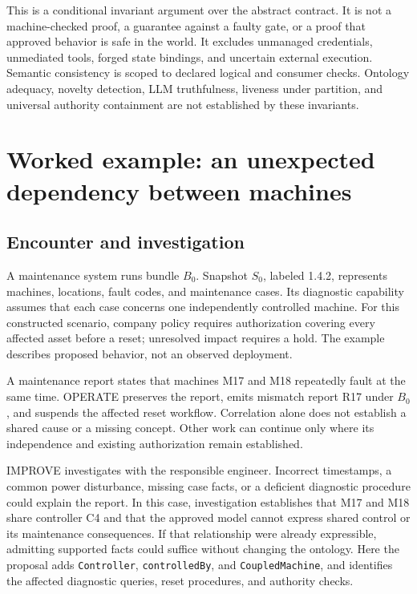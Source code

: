 \documentclass[preprint,12pt,authoryear]{elsarticle}
\begin{document}
This is a conditional invariant argument over the abstract contract. It
is not a machine-checked proof, a guarantee against a faulty gate, or a
proof that approved behavior is safe in the world. It excludes unmanaged
credentials, unmediated tools, forged state bindings, and uncertain
external execution. Semantic consistency is scoped to declared logical
and consumer checks. Ontology adequacy, novelty detection, LLM
truthfulness, liveness under partition, and universal authority
containment are not established by these invariants.

\section{Worked example: an unexpected dependency between
machines}\label{worked-example-an-unexpected-dependency-between-machines}

\subsection{Encounter and
investigation}\label{encounter-and-investigation}

A maintenance system runs bundle \(B_0\). Snapshot \(S_0\), labeled
1.4.2, represents machines, locations, fault codes, and maintenance
cases. Its diagnostic capability assumes that each case concerns one
independently controlled machine. For this constructed scenario, company
policy requires authorization covering every affected asset before a
reset; unresolved impact requires a hold. The example describes proposed
behavior, not an observed deployment.

A maintenance report states that machines M17 and M18 repeatedly fault
at the same time. OPERATE preserves the report, emits mismatch report
R17 under \(B_0\), and suspends the affected reset workflow. Correlation
alone does not establish a shared cause or a missing concept. Other work
can continue only where its independence and existing authorization
remain established.

IMPROVE investigates with the responsible engineer. Incorrect
timestamps, a common power disturbance, missing case facts, or a
deficient diagnostic procedure could explain the report. In this case,
investigation establishes that M17 and M18 share controller C4 and that
the approved model cannot express shared control or its maintenance
consequences. If that relationship were already expressible, admitting
supported facts could suffice without changing the ontology. Here the
proposal adds \texttt{Controller}, \texttt{controlledBy}, and
\texttt{CoupledMachine}, and identifies the affected diagnostic queries,
reset procedures, and authority checks.
\end{document}
